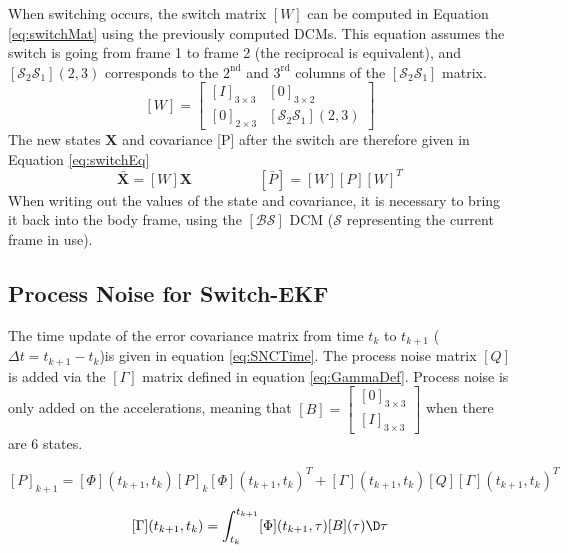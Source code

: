 \documentclass[]{BasiliskReportMemo}
\begin{document}
When switching occurs, the switch matrix $[W]$ can be computed in Equation \eqref{eq:switchMat} using the previously computed DCMs. This equation assumes the switch is going from frame 1 to frame 2 (the reciprocal is equivalent), and $[\mathcal{S}_2 \mathcal{S}_1](2,3)$ corresponds to the $2^{\text{nd}}$ and $3^{\text{rd}}$ columns of the $[\mathcal{S}_2 \mathcal{S}_1]$ matrix. 
\begin{equation}\label{eq:switchMat}
[W] = \begin{bmatrix} [I]_{3\times 3} & [0]_{3 \times 2} \\ [0]_{2 \times 3} & [\mathcal{S}_2 \mathcal{S}_1](2,3)\end{bmatrix}
\end{equation}
The new states $\bm X$ and covariance [P] after the switch are therefore given in Equation \eqref{eq:switchEq}
\begin{equation}\label{eq:switchEq}
\bar{\bm X} = [W] \bm X \hspace{2cm} [\bar{P}] = [W] [P] [W]^T
\end{equation}
When writing out the values of the state and covariance, it is necessary to bring it back into the body frame, using the $[\mathcal{B}\mathcal{S}]$ DCM ($\mathcal{S}$ representing the current frame in use).
%
\subsection{Process Noise for Switch-EKF} %

The time update of the error covariance matrix from time $t_k$ to $t_{k+1}$ ($\Delta t = t_{k+1} - t_k$)is given in equation \eqref{eq:SNCTime}. The process noise matrix $[Q]$ is added via the $[\Gamma]$ matrix defined in equation \eqref{eq:GammaDef}. Process noise is only added on the accelerations, meaning that $[B] = \begin{bmatrix} [0]_{3 \times 3} \\ [I]_{3 \times 3}\end{bmatrix}$ when there are 6 states.

\begin{equation}\label{eq:SNCTime}
[P]_{k+1} = [\Phi](t_{k+1}, t_k) [P]_k  [\Phi](t_{k+1}, t_k)^T +  [\Gamma](t_{k+1}, t_k) [Q]  [\Gamma](t_{k+1}, t_k) ^T
\end{equation}

\begin{equation}\label{eq:GammaDef}
  [\Gamma](t_{k+1}, t_k) = \int_{t_k}^{t_{k+1}}  [\Phi](t_{k+1}, \tau) [B](\tau) \D \tau 
\end{equation}
\end{document}

